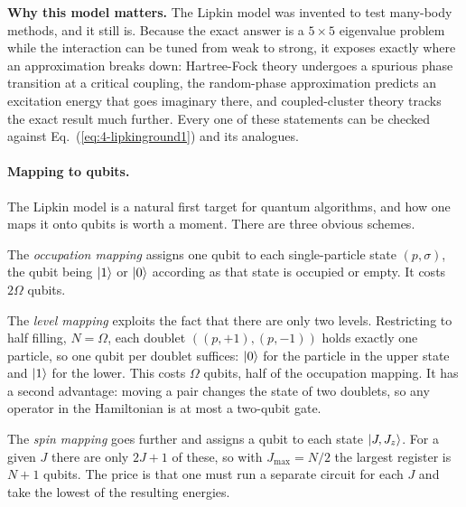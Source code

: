 \begin{notebox}
\textbf{Why this model matters.} The Lipkin model was invented to test
many-body methods, and it still is.  Because the exact answer is a
$5\times5$ eigenvalue problem while the interaction can be tuned from weak to
strong, it exposes exactly where an approximation breaks down: Hartree-Fock
theory undergoes a spurious phase transition at a critical coupling, the
random-phase approximation predicts an excitation energy that goes imaginary
there, and coupled-cluster theory tracks the exact result much further.  Every
one of these statements can be checked against
Eq.~(\ref{eq:4-lipkinground1}) and its analogues.
\end{notebox}

\paragraph{Mapping to qubits.}
The Lipkin model is a natural first target for quantum algorithms, and how one
maps it onto qubits is worth a moment.  There are three obvious schemes.

The \emph{occupation mapping} assigns one qubit to each single-particle state
$(p,\sigma)$, the qubit being $\vert 1 \rangle$ or $\vert 0 \rangle$ according as that state
is occupied or empty.  It costs $2\Omega$ qubits.

The \emph{level mapping} exploits the fact that there are only two levels.
Restricting to half filling, $N=\Omega$, each doublet $\left((p,+1),
(p,-1)\right)$ holds exactly one particle, so one qubit per doublet suffices:
$\vert 0 \rangle$ for the particle in the upper state and $\vert 1 \rangle$ for the lower.
This costs $\Omega$ qubits, half of the occupation mapping.  It has a second
advantage: moving a pair changes the state of two doublets, so any operator in
the Hamiltonian is at most a two-qubit gate.

The \emph{spin mapping} goes further and assigns a qubit to each state
$\vert J,J_z \rangle$.  For a given $J$ there are only $2J+1$ of these, so with
$J_{\max}=N/2$ the largest register is $N+1$ qubits.  The price is that one
must run a separate circuit for each $J$ and take the lowest of the resulting
energies.

